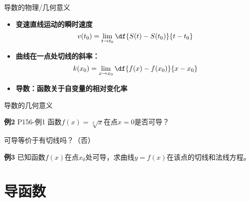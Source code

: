 \begin{frame}{导数的物理/几何意义}
	\linespread{1.5}\pause 
	\begin{itemize}
	  \item {\bf 变速直线运动的瞬时速度}\pause
	  $$v(t_0)=\lim\limits_{t\to t_0}\df{S(t)-S(t_0)}{t-t_0}$$
	\end{itemize}
	\pause
	\begin{itemize}
	  \item {\bf 曲线在一点处切线的斜率：}\pause
	  $$k(x_0)=\lim\limits_{x\to x_0}\df{f(x)-f(x_0)}{x-x_0}$$
	\end{itemize} 
	\pause
	\begin{itemize}
	  \item \alert{\bf 导数：函数关于自变量的相对变化率}
	\end{itemize}
\end{frame}

\begin{frame}{导数的几何意义}
	\linespread{1.5}\pause 
	\begin{exampleblock}{{\bf 例2} \hfill P156-例1}
		函数$f(x)=\sqrt[3]x$在点$x=0$是否可导？
	\end{exampleblock}\pause 
	{}可导等价于有切线吗？\pause （\alert{否}）\pause 
	\bigskip
	\begin{exampleblock}{{\bf 例3} \hfill }
		已知函数$f(x)$在点$x_0$处可导，求曲线$y=f(x)$在该点的切线和法线方程。
	\end{exampleblock}
\end{frame}

\section{导函数}



